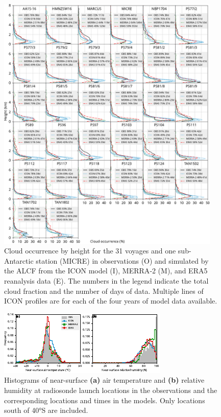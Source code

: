 \documentclass[draft,jgrga]{agutexSI2019}
\begin{document}
\begin{figure}[p!]
\centerline{
\includegraphics[width=0.95\textwidth]{img/cl.pdf}
}
\caption{
Cloud occurrence by height for the 31 voyages and one sub-Antarctic station (MICRE) in observations (O) and simulated by the ALCF from the ICON model (I), MERRA‐2 (M), and ERA5 reanalysis data (E). The numbers in the legend indicate the total cloud fraction and the number of days of data. Multiple lines of ICON profiles are for each of the four years of model data available.
}
\label{fig:cloud-occurrence-panel}
\end{figure}

\begin{figure}[p!]
\includegraphics[width=\textwidth]{img/stats_hist_surf.pdf}
\caption{
Histograms of near-surface \textbf{(a)} air temperature and \textbf{(b)} relative humidity at radiosonde launch locations in the observations and the corresponding locations and times in the models. Only locations south of 40°S are included.
}
\label{fig:stats-hist-surf}
\end{figure}
\end{document}
